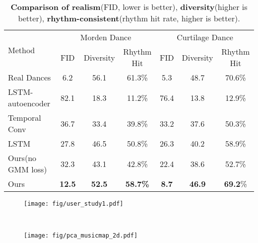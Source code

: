 \setlength{\tabcolsep}{4pt}
\begin{table}[t]
\begin{center}
\caption{
\textbf{Comparison of realism}(FID, lower is better), \textbf{diversity}(higher is better), \textbf{rhythm-consistent}(rhythm hit rate, higher is better). 
}
\label{table:comparison_result}
\begin{tabular}{l c c c| c c c}
\toprule
  \multirow{2}{*}{Method} & \multicolumn{3}{c}{Morden Dance} &  \multicolumn{3}{c}{Curtilage Dance}\\ 
   \cmidrule(lr){2-4}\cmidrule(lr){5-7}
   & FID & Diversity &   Rhythm Hit & FID & Diversity &   Rhythm Hit \\
Real Dances & 6.2 & 56.1 & 61.3\% & 5.3 & 48.7 & 70.6\% \\
\midrule
LSTM-autoencoder\cite{tang2018dance} & 82.1 & 18.3 & 11.2\% & 76.4 & 13.8 & 12.9\%\\
Temporal Conv\cite{ginosar2019learning} & 36.7 & 33.4 & 39.8\% & 33.2 & 37.6 & 50.3\%\\
LSTM\cite{lee2018interactive} & 27.8 & 46.5 & 50.8\% & 26.3 & 40.2 & 58.9\%\\
\midrule
Ours(no GMM loss) & 32.3 & 43.1 & 42.8\% & 22.4 & 38.6 & 52.7\%\\
Ours & \textbf{12.5} & \textbf{52.5} & \textbf{58.7\%} & \textbf{8.7} & \textbf{46.9} & \textbf{69.2}\%\\
\bottomrule	
\end{tabular}
\end{center}
\end{table}
\setlength{\tabcolsep}{1.4pt}


\begin{figure}[t] 
  \begin{minipage}[t]{0.45\textwidth} 
  \centering 
    \texttt{[image: fig/user\_study1.pdf]} 
    \label{fig:user_study} 
  \end{minipage}\begin{minipage}{0.03\textwidth}
  \
  \end{minipage}
  \begin{minipage}[t]{0.52\textwidth} 
  \centering 
    \texttt{[image: fig/pca\_musicmap\_2d.pdf]} 
    \label{fig:pca_musicmap} 
  \end{minipage}\end{figure}


